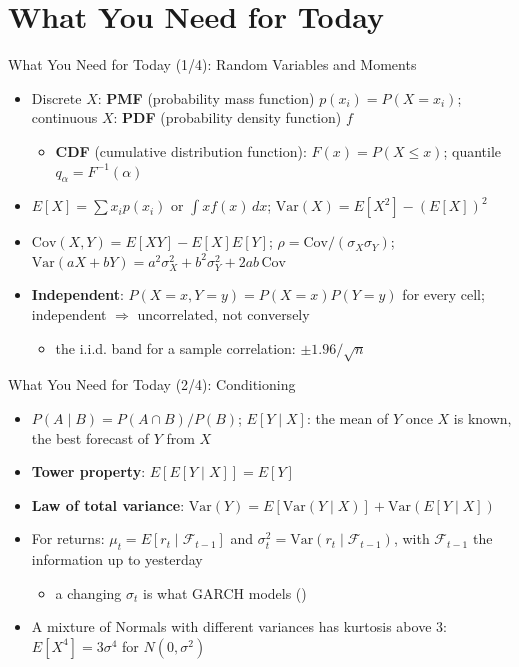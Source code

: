 \section{What You Need for Today}

\begin{frame}{What You Need for Today (1/4): Random Variables and Moments}
\itemsize{\footnotesize}
\begin{itemize}
    \item Discrete $X$: \textbf{PMF} (probability mass function) $p(x_i) = P(X = x_i)$; continuous $X$: \textbf{PDF} (probability density function) $f$
    \begin{itemize}
        \item \textbf{CDF} (cumulative distribution function): $F(x) = P(X \le x)$; quantile $q_\alpha = F^{-1}(\alpha)$
    \end{itemize}
    \item $E[X] = \sum x_i p(x_i)$ or $\int x f(x)\,dx$; $\text{Var}(X) = E[X^2] - (E[X])^2$
    \item $\text{Cov}(X, Y) = E[XY] - E[X]E[Y]$; $\rho = \text{Cov}/(\sigma_X\sigma_Y)$; $\text{Var}(aX + bY) = a^2\sigma_X^2 + b^2\sigma_Y^2 + 2ab\,\text{Cov}$
    \item \textbf{Independent}: $P(X = x, Y = y) = P(X = x)P(Y = y)$ for every cell; independent $\Rightarrow$ uncorrelated, not conversely
    \begin{itemize}
        \item the i.i.d. band for a sample correlation: $\pm 1.96/\sqrt{n}$
    \end{itemize}
\end{itemize}
\end{frame}

\begin{frame}{What You Need for Today (2/4): Conditioning}
\itemsize{\footnotesize}
\begin{itemize}
    \item $P(A \mid B) = P(A \cap B)/P(B)$; $E[Y \mid X]$: the mean of $Y$ once $X$ is known, the best forecast of $Y$ from $X$
    \item \textbf{Tower property}: $E[E[Y \mid X]] = E[Y]$
    \item \textbf{Law of total variance}: $\text{Var}(Y) = E[\text{Var}(Y \mid X)] + \text{Var}(E[Y \mid X])$
    \item For returns: $\mu_t = E[r_t \mid \mathcal{F}_{t-1}]$ and $\sigma_t^2 = \text{Var}(r_t \mid \mathcal{F}_{t-1})$, with $\mathcal{F}_{t-1}$ the information up to yesterday
    \begin{itemize}
        \item a changing $\sigma_t$ is what GARCH models ()
    \end{itemize}
    \item A mixture of Normals with different variances has kurtosis above 3: $E[X^4] = 3\sigma^4$ for $N(0, \sigma^2)$
\end{itemize}
\end{frame}

